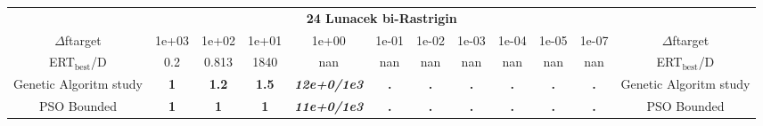 \begin{tabular}{cccccccccccc}
 & \multicolumn{10}{c}{{\normalsize \textbf{24 Lunacek bi-Rastrigin}}}\\
$\Delta$ftarget& 1e+03& 1e+02& 1e+01& 1e+00& 1e-01& 1e-02& 1e-03& 1e-04& 1e-05& 1e-07 & $\Delta$ftarget \\
ERT$_{\textrm{best}}$/D& 0.2& 0.813& 1840& nan& nan& nan& nan& nan& nan& nan & ERT$_{\textrm{best}}$/D \\
\hline
Genetic Algoritm study & \textbf{1} & \textbf{1.2} & \textbf{1.5} & \textbf{\textit{12e+0}\textit{/1e3}} & \textbf{.} & \textbf{.} & \textbf{.} & \textbf{.} & \textbf{.} & \textbf{.} & Genetic Algoritm study \cite{add_an_entry_for_Genetic Algoritm study_in_bbob.bib}\\
PSO Bounded & \textbf{1} & \textbf{1} & \textbf{1} & \textbf{\textit{11e+0}\textit{/1e3}} & \textbf{.} & \textbf{.} & \textbf{.} & \textbf{.} & \textbf{.} & \textbf{.} & PSO Bounded \cite{add_an_entry_for_PSO Bounded_in_bbob.bib}
\end{tabular}
